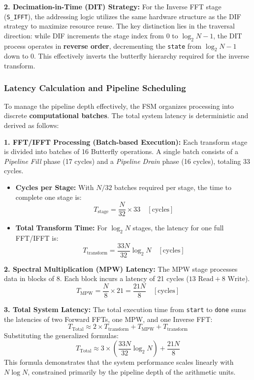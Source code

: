 \textbf{2. Decimation-in-Time (DIT) Strategy:}
For the Inverse FFT stage (\texttt{S\_IFFT}), the addressing logic utilizes the same hardware structure as the DIF strategy to maximize resource reuse. The key distinction lies in the traversal direction: while DIF increments the stage index from $0$ to $\log_2 N - 1$, the DIT process operates in \textbf{reverse order}, decrementing the \texttt{state} from $\log_2 N - 1$ down to $0$. This effectively inverts the butterfly hierarchy required for the inverse transform.

\subsubsection{Latency Calculation and Pipeline Scheduling}
To manage the pipeline depth effectively, the FSM organizes processing into discrete \textbf{computational batches}. The total system latency is deterministic and derived as follows:

\textbf{1. FFT/IFFT Processing (Batch-based Execution):}
Each transform stage is divided into batches of 16 Butterfly operations. A single batch consists of a \textit{Pipeline Fill} phase (17 cycles) and a \textit{Pipeline Drain} phase (16 cycles), totaling 33 cycles.
\begin{itemize}
    \item \textbf{Cycles per Stage:} With $N/32$ batches required per stage, the time to complete one stage is:
    \begin{equation}
        T_{\text{stage}} = \frac{N}{32} \times 33 \quad [\text{cycles}]
    \end{equation}
    \item \textbf{Total Transform Time:} For $\log_2 N$ stages, the latency for one full FFT/IFFT is:
    \begin{equation}
        T_{\text{transform}} = \frac{33N}{32} \log_2 N \quad [\text{cycles}]
    \end{equation}
\end{itemize}

\textbf{2. Spectral Multiplication (MPW) Latency:}
The MPW stage processes data in blocks of 8. Each block incurs a latency of 21 cycles ($13 \text{ Read} + 8 \text{ Write}$).
\begin{equation}
    T_{\text{MPW}} = \frac{N}{8} \times 21 = \frac{21N}{8} \quad [\text{cycles}]
\end{equation}

\textbf{3. Total System Latency:}
The total execution time from \texttt{start} to \texttt{done} sums the latencies of two Forward FFTs, one MPW, and one Inverse FFT:
\begin{equation}
    T_{\text{Total}} \approx 2 \times T_{\text{transform}} + T_{\text{MPW}} + T_{\text{transform}}
\end{equation}
Substituting the generalized formulas:
\begin{equation}
    T_{\text{Total}} \approx 3 \times \left( \frac{33N}{32} \log_2 N \right) + \frac{21N}{8}
\end{equation}
This formula demonstrates that the system performance scales linearly with $N \log N$, constrained primarily by the pipeline depth of the arithmetic units.

